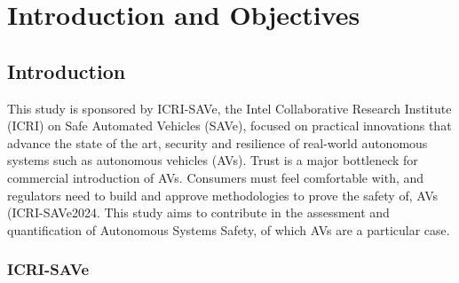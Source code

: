 

\chapter{Introduction and Objectives}
\label{Intro} 


\section{Introduction}

This study is sponsored by ICRI-SAVe, the Intel Collaborative Research Institute (ICRI) on Safe Automated Vehicles (SAVe), focused on practical innovations that advance the state of the art, security and resilience of real-world autonomous systems such as autonomous vehicles (AVs). Trust is a major bottleneck for commercial introduction of AVs. Consumers must feel comfortable with, and regulators need to build and approve methodologies to prove the safety of, AVs ({ICRI-SAVe2024}. This study aims to contribute in the assessment and quantification of Autonomous Systems Safety, of which AVs are a particular case.

\subsection{ICRI-SAVe}

